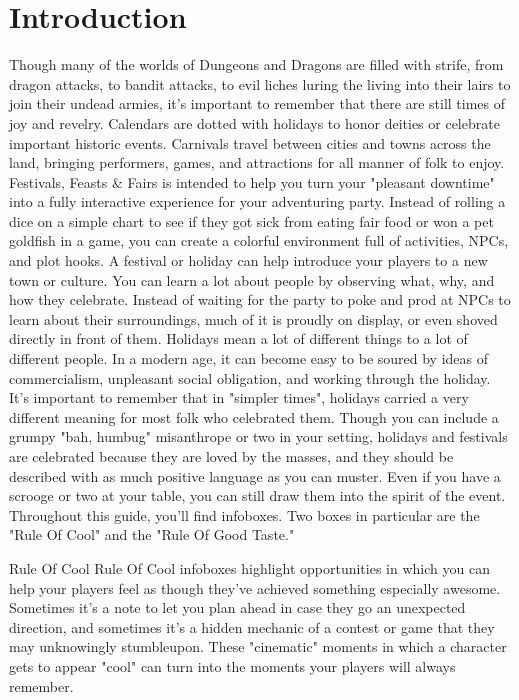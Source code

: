 \documentclass[10pt,a4paper,twoside,twocolumn,openany,bg=print,nodeprecatedcode]{dndbook}
\begin{document}
\tableofcontents
\newpage
\chapter{Introduction}
Though many of the worlds of Dungeons and Dragons are filled with strife, from dragon attacks, to bandit attacks, to evil liches luring the living into their lairs to join their undead armies, it's important to remember that there are still times of joy and revelry. Calendars are dotted with holidays to honor deities or celebrate important historic events. Carnivals travel between cities and towns across the land, bringing performers, games, and attractions for all manner of folk to enjoy.
Festivals, Feasts \& Fairs is intended to help you turn your "pleasant downtime" into a fully interactive experience for your adventuring party. Instead of rolling a dice on a simple chart to see if they got sick from eating fair food or won a pet goldfish in a game, you can create a colorful environment full of activities, NPCs, and plot hooks.
A festival or holiday can help introduce your players to a new town or culture. You can learn a lot about people by observing what, why, and how they celebrate. Instead of waiting for the party to poke and prod at NPCs to learn about their surroundings, much of it is proudly on display, or even shoved directly in front of them.
Holidays mean a lot of different things to a lot of different people. In a modern age, it can become easy to be soured by ideas of commercialism, unpleasant social obligation, and working through the holiday. It's important to remember that in "simpler times", holidays carried a very different meaning for most folk who celebrated them. Though you can include a grumpy "bah, humbug" misanthrope or two in your setting, holidays and festivals are celebrated because they are loved by the masses, and they should be described with as much positive language as you can muster. Even if you have a scrooge or two at your table, you can still draw them into the spirit of the event.
Throughout this guide, you'll find infoboxes. Two boxes in particular are the "Rule Of Cool" and the "Rule Of Good Taste."
\begin{DndComment}{Rule Of Cool}
Rule Of Cool infoboxes highlight opportunities in which you can help your players feel as though they've achieved something especially awesome. Sometimes it's a note to let you plan ahead in case they go an unexpected direction, and sometimes it's a hidden mechanic of a contest or game that they may unknowingly stumbleupon. These "cinematic" moments in which a character gets to appear "cool" can turn into the moments your players will always remember.
\end{DndComment}
\end{document}
